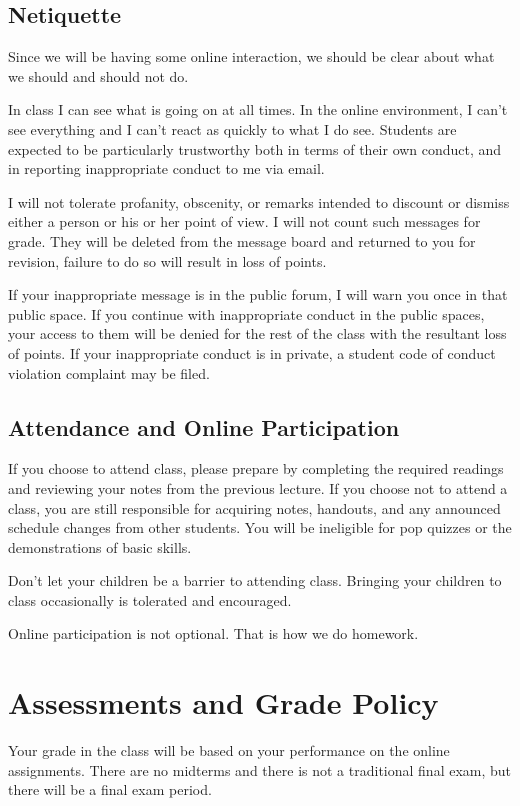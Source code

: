 \documentclass[letterpaper,10pt]{article}
\begin{document}
\subsection{Netiquette}
Since we will be having some online interaction, we should be clear
about what we should and should not do.

In class I can see what is going on at all times.  In the online
environment, I can't see everything and I can't react as quickly to
what I do see.  Students are expected to be particularly trustworthy
both in terms of their own conduct, and in reporting inappropriate
conduct to me via email.

I will not tolerate profanity, obscenity, or remarks intended to
discount or dismiss either a person or his or her point of view. I
will not count such messages for grade. They will be deleted from the
message board and returned to you for revision, failure to do so will
result in loss of points.

If your inappropriate message is in the public forum, I will warn you
once in that public space. If you continue with inappropriate conduct
in the public spaces, your access to them will be denied for the rest
of the class with the resultant loss of points. If your inappropriate
conduct is in private, a student code of conduct violation complaint
may be filed.

\subsection{Attendance and Online Participation}

If you choose to attend class, please prepare by
completing the required readings and reviewing your notes from the
previous lecture. If you choose not to attend a class, you are still
responsible for acquiring notes, handouts, and any announced schedule
changes from other students.  You will be ineligible for pop quizzes
or the demonstrations of basic skills.

Don't let your children be a barrier to attending class. Bringing your
children to class occasionally is tolerated and encouraged.

Online participation is not optional.  That is how we do homework.

\section{Assessments and Grade Policy}

Your grade in the class will be based on your performance on the
online assignments.  There are no midterms and there is
not a traditional final exam, but there will be a final exam period.
\end{document}

